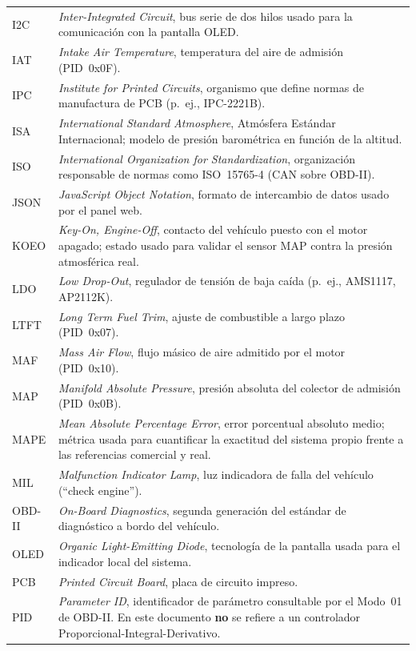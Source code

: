\begin{longtable}{@{}p{2.6cm}p{11.5cm}@{}}
	I2C & \textit{Inter-Integrated Circuit}, bus serie de dos hilos usado para la comunicación con la pantalla OLED. \\
	IAT & \textit{Intake Air Temperature}, temperatura del aire de admisión (PID~0x0F). \\
	IPC & \textit{Institute for Printed Circuits}, organismo que define normas de manufactura de PCB (p.~ej., IPC-2221B). \\
	ISA & \textit{International Standard Atmosphere}, Atmósfera Estándar Internacional; modelo de presión barométrica en función de la altitud. \\
	ISO & \textit{International Organization for Standardization}, organización responsable de normas como ISO~15765-4 (CAN sobre OBD-II). \\
	JSON & \textit{JavaScript Object Notation}, formato de intercambio de datos usado por el panel web. \\
	KOEO & \textit{Key-On, Engine-Off}, contacto del vehículo puesto con el motor apagado; estado usado para validar el sensor MAP contra la presión atmosférica real. \\
	LDO & \textit{Low Drop-Out}, regulador de tensión de baja caída (p.~ej., AMS1117, AP2112K). \\
	LTFT & \textit{Long Term Fuel Trim}, ajuste de combustible a largo plazo (PID~0x07). \\
	MAF & \textit{Mass Air Flow}, flujo másico de aire admitido por el motor (PID~0x10). \\
	MAP & \textit{Manifold Absolute Pressure}, presión absoluta del colector de admisión (PID~0x0B). \\
	MAPE & \textit{Mean Absolute Percentage Error}, error porcentual absoluto medio; métrica usada para cuantificar la exactitud del sistema propio frente a las referencias comercial y real. \\
	MIL & \textit{Malfunction Indicator Lamp}, luz indicadora de falla del vehículo (``check engine''). \\
	OBD-II & \textit{On-Board Diagnostics}, segunda generación del estándar de diagnóstico a bordo del vehículo. \\
	OLED & \textit{Organic Light-Emitting Diode}, tecnología de la pantalla usada para el indicador local del sistema. \\
	PCB & \textit{Printed Circuit Board}, placa de circuito impreso. \\
	PID & \textit{Parameter ID}, identificador de parámetro consultable por el Modo~01 de OBD-II. En este documento \textbf{no} se refiere a un controlador Proporcional-Integral-Derivativo. \\

\end{longtable}
